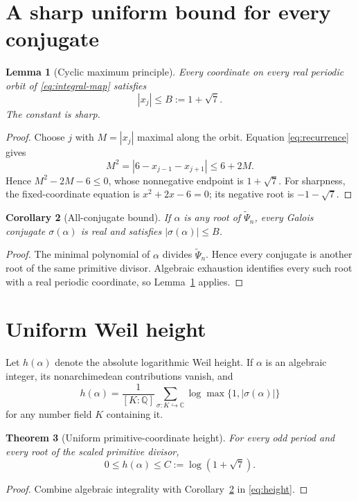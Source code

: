 \documentclass[11pt]{article}
\newtheorem{theorem}{Theorem}[section]
\newtheorem{lemma}[theorem]{Lemma}
\newtheorem{corollary}[theorem]{Corollary}
\theoremstyle{remark}
\newcommand{\htw}{h}
\begin{document}
\section{A sharp uniform bound for every conjugate}
\begin{lemma}[Cyclic maximum principle]\label{lem:max}
Every coordinate on every real periodic orbit of \eqref{eq:integral-map}
satisfies
\begin{equation}\label{eq:root-bound}
|x_j|\le B:=1+\sqrt7.
\end{equation}
The constant is sharp.
\end{lemma}
\begin{proof}
Choose $j$ with $M=|x_j|$ maximal along the orbit.  Equation
\eqref{eq:recurrence} gives
\[
M^2=|6-x_{j-1}-x_{j+1}|\le6+2M.
\]
Hence $M^2-2M-6\le0$, whose nonnegative endpoint is $1+\sqrt7$.
For sharpness, the fixed-coordinate equation is
$x^2+2x-6=0$; its negative root is $-1-\sqrt7$.
\end{proof}

\begin{corollary}[All-conjugate bound]\label{cor:conjugate}
If $\alpha$ is any root of $\widetilde\Psi_n$, every Galois conjugate
$\sigma(\alpha)$ is real and satisfies $|\sigma(\alpha)|\le B$.
\end{corollary}
\begin{proof}
The minimal polynomial of $\alpha$ divides $\widetilde\Psi_n$.  Hence every
conjugate is another root of the same primitive divisor.  Algebraic
exhaustion identifies every such root with a real periodic coordinate, so
Lemma~\ref{lem:max} applies.
\end{proof}

\section{Uniform Weil height}
Let $\htw(\alpha)$ denote the absolute logarithmic Weil height.  If $\alpha$
is an algebraic integer, its nonarchimedean contributions vanish, and
\begin{equation}\label{eq:height}
\htw(\alpha)=\frac1{[K:\mathbb Q]}
\sum_{\sigma:K\hookrightarrow\mathbb C}
\log\max\{1,|\sigma(\alpha)|\}
\end{equation}
for any number field $K$ containing it.

\begin{theorem}[Uniform primitive-coordinate height]\label{thm:height}
For every odd period and every root of the scaled primitive divisor,
\begin{equation}\label{eq:height-bound}
0\le\htw(\alpha)\le C:=\log(1+\sqrt7).
\end{equation}
\end{theorem}
\begin{proof}
Combine algebraic integrality with Corollary~\ref{cor:conjugate} in
\eqref{eq:height}.
\end{proof}
\end{document}
